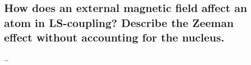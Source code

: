 \subsection{How does an external magnetic field affect an atom in LS-coupling? Describe the Zeeman effect without accounting for the nucleus.}


\ldots